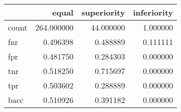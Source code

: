 \begin{tabular}{lrrr}
\toprule
{} &       equal &  superiority &  inferiority \\
\midrule
count &  264.000000 &    44.000000 &     1.000000 \\
fnr   &    0.496398 &     0.488889 &     0.111111 \\
fpr   &    0.481750 &     0.284303 &     0.000000 \\
tnr   &    0.518250 &     0.715697 &     0.000000 \\
tpr   &    0.503602 &     0.288889 &     0.000000 \\
bacc  &    0.510926 &     0.391182 &     0.000000 \\
\bottomrule
\end{tabular}
